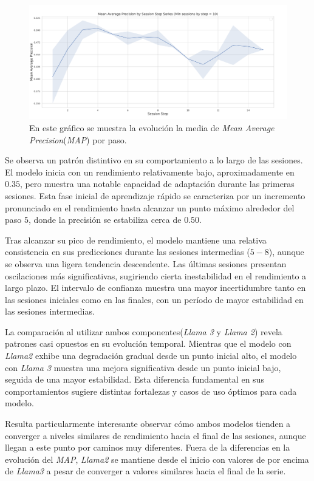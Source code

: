 \documentclass[11pt,a4paper,twoside]{thesis}
\begin{document}
\begin{figure}[H]
	\centering
	\includegraphics[width=15cm]{./images/llama3/mean_average_precision_by_session_step_series.png}
	\caption{En este gráfico se muestra la evolución la media de \textit{Mean Average Precision}(\textit{MAP}) por paso.}
	\label{fig:llama3-mean_average_precision_by_session_step_series}
\end{figure}

Se observa un patrón distintivo en su comportamiento a lo largo de las sesiones. El modelo inicia con un rendimiento relativamente bajo, aproximadamente en $0.35$, pero muestra una notable capacidad de adaptación durante las primeras sesiones. Esta fase inicial de aprendizaje rápido se caracteriza por un incremento pronunciado en el rendimiento hasta alcanzar un punto máximo alrededor del paso $5$, donde la precisión se estabiliza cerca de $0.50$.

Tras alcanzar su pico de rendimiento, el modelo mantiene una relativa consistencia en sus predicciones durante las sesiones intermedias ($5-8$), aunque se observa una ligera tendencia descendente. Las últimas sesiones presentan oscilaciones más significativas, sugiriendo cierta inestabilidad en el rendimiento a largo plazo. El intervalo de confianza muestra una mayor incertidumbre tanto en las sesiones iniciales como en las finales, con un período de mayor estabilidad en las sesiones intermedias.

La comparación al utilizar ambos componentes(\textit{Llama 3} y \textit{Llama 2}) revela patrones casi opuestos en su evolución temporal. Mientras que el modelo con \textit{Llama2} exhibe una degradación gradual desde un punto inicial alto, el modelo con \textit{Llama 3} muestra una mejora significativa desde un punto inicial bajo, seguida de una mayor estabilidad. Esta diferencia fundamental en sus comportamientos sugiere distintas fortalezas y casos de uso óptimos para cada modelo.

Resulta particularmente interesante observar cómo ambos modelos tienden a converger a niveles similares de rendimiento hacia el final de las sesiones, aunque llegan a este punto por caminos muy diferentes. Fuera de la diferencias en la evolución del \textit{MAP}, \textit{Llama2} se mantiene desde el inicio con valores de por encima de \textit{Llama3} a pesar de converger a valores similares hacia el final de la serie.
\end{document}

